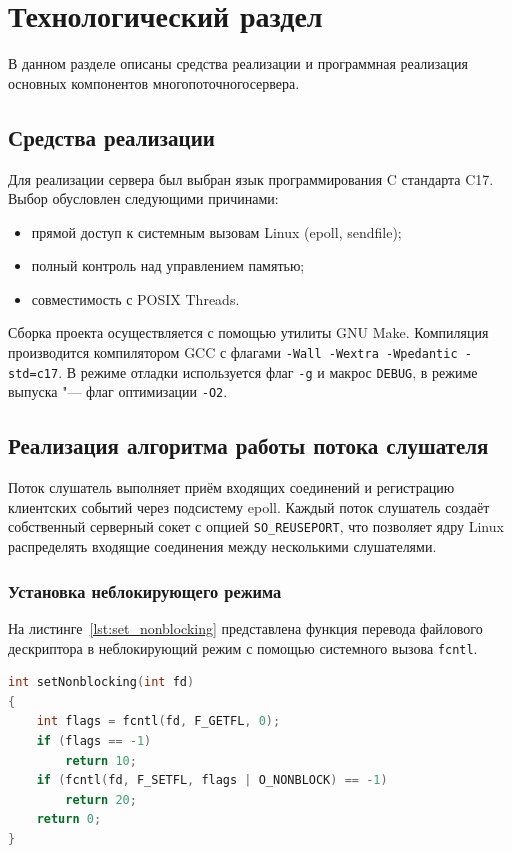 \chapter{Технологический раздел}
В данном разделе описаны средства реализации и программная реализация
основных компонентов многопоточногосервера.

\section{Средства реализации}
Для реализации сервера был выбран язык программирования C стандарта C17.
Выбор обусловлен следующими причинами:
\begin{itemize}
	\item прямой доступ к системным вызовам Linux (epoll, sendfile);
	\item полный контроль над управлением памятью;
	\item совместимость с POSIX Threads.
\end{itemize}

Сборка проекта осуществляется с помощью утилиты GNU Make.
Компиляция производится компилятором GCC с флагами
\texttt{-Wall -Wextra -Wpedantic -std=c17}.
В режиме отладки используется флаг \texttt{-g} и макрос \texttt{DEBUG},
в режиме выпуска "--- флаг оптимизации \texttt{-O2}.

\section{Реализация алгоритма работы потока слушателя}
Поток слушатель выполняет приём входящих соединений
и регистрацию клиентских событий через подсистему epoll.
Каждый поток слушатель создаёт собственный серверный сокет
с опцией \texttt{SO\_REUSEPORT}, что позволяет ядру Linux
распределять входящие соединения между несколькими слушателями.

\subsection{Установка неблокирующего режима}
На листинге~\ref{lst:set_nonblocking} представлена функция перевода
файлового дескриптора в неблокирующий режим с помощью системного вызова
\texttt{fcntl}.

\begin{lstlisting}[caption={Установка неблокирующего режима},label={lst:set_nonblocking},language=C]
int setNonblocking(int fd)
{
    int flags = fcntl(fd, F_GETFL, 0);
    if (flags == -1)
        return 10;
    if (fcntl(fd, F_SETFL, flags | O_NONBLOCK) == -1)
        return 20;
    return 0;
}
\end{lstlisting}


